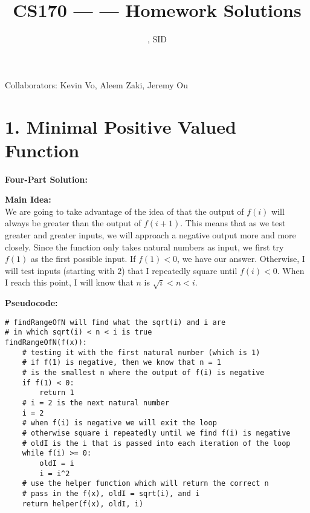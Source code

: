 \documentclass[11pt]{article}
\title{CS170 --- \Session --- Homework \Homework \space Solutions}
\author{\Name, SID \SID}
\date{}
\newenvironment{FourPartSolution}{\par{\bf Four-Part Solution:}}{\smallskip}
\newenvironment{mainIdea}{\par{\bf Main Idea:}}{\smallskip}
\newenvironment{pseudocode}{\par{\bf Pseudocode:}}{\smallskip}
\begin{document}
\maketitle

Collaborators: Kevin Vo, Aleem Zaki, Jeremy Ou

\section*{1. Minimal Positive Valued Function}
\begin{FourPartSolution}
\begin{mainIdea}
\\
We are going to take advantage of the idea of that the output of $f(i)$ will always be greater than the output of $f(i + 1)$. This means that as we test greater and greater inputs, we will approach a negative output more and more closely. Since the function only takes natural numbers as input, we first try $f(1)$ as the first possible input. If $f(1) < 0$, we have our answer. Otherwise, I will test inputs (starting with $2$) that I repeatedly square until $f(i) < 0$. When I reach this point, I will know that $n$ is $\sqrt{i} < n < i$.
\end{mainIdea}
\\
\begin{pseudocode}
\begin{lstlisting}
# findRangeOfN will find what the sqrt(i) and i are
# in which sqrt(i) < n < i is true
findRangeOfN(f(x)):
	# testing it with the first natural number (which is 1)
	# if f(1) is negative, then we know that n = 1
	# is the smallest n where the output of f(i) is negative
	if f(1) < 0:
		return 1
	# i = 2 is the next natural number
	i = 2
	# when f(i) is negative we will exit the loop
	# otherwise square i repeatedly until we find f(i) is negative
	# oldI is the i that is passed into each iteration of the loop
	while f(i) >= 0:
		oldI = i
		i = i^2
	# use the helper function which will return the correct n
	# pass in the f(x), oldI = sqrt(i), and i
	return helper(f(x), oldI, i)


\end{lstlisting}
\end{pseudocode}
\end{FourPartSolution}
\end{document}

